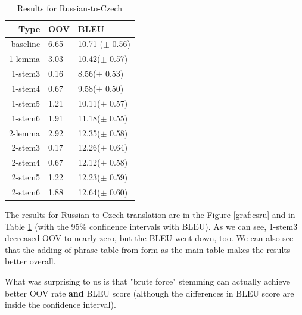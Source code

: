\documentclass[11pt,letterpaper]{article}
\begin{document}
\begin{table}

\begin{center}
\begin{tabular}{|r|l|l|}
  \hline
  \textbf{Type} & \textbf{OOV} & \textbf{BLEU} \\
\hline
baseline & 6.65 &  10.71 ($\pm$ 0.56) \\ \hline %
1-lemma & 3.03  & 10.42($\pm$ 0.57) \\ \hline   %
1-stem3 & 0.16 & 8.56($\pm$ 0.53) \\ \hline     %
1-stem4 & 0.67 & 9.58($\pm$ 0.50)\\ \hline      %
1-stem5 & 1.21 & 10.11($\pm$ 0.57) \\ \hline    %
1-stem6 & 1.91 & 11.18($\pm$ 0.55)\\ \hline     %
2-lemma & 2.92 & 12.35($\pm$ 0.58) \\ \hline    %
2-stem3 & 0.17 & 12.26($\pm$ 0.64) \\ \hline    %
2-stem4 & 0.67 & 12.12($\pm$ 0.58) \\ \hline    %
2-stem5 & 1.22 & 12.23($\pm$ 0.59) \\ \hline    %
2-stem6 & 1.88 & 12.64($\pm$ 0.60) \\           %

\hline
\end{tabular}
\end{center}
\caption{Results for Russian-to-Czech}
\label{tab:rescs}
\end{table}

The results for Russian to Czech translation are in the Figure \ref{graf:csru} and in Table \ref{tab:rescs} (with the 95\% confidence intervals with BLEU). As we can see, 1-stem3 decreased OOV to nearly zero, but the BLEU went down, too. We can also see that the adding of phrase table from form as the main table makes the results better overall.

What was surprising to us is that "brute force" stemming can actually achieve better OOV rate \textbf{and} BLEU score (although the differences in BLEU score are inside the confidence interval).
\end{document}
